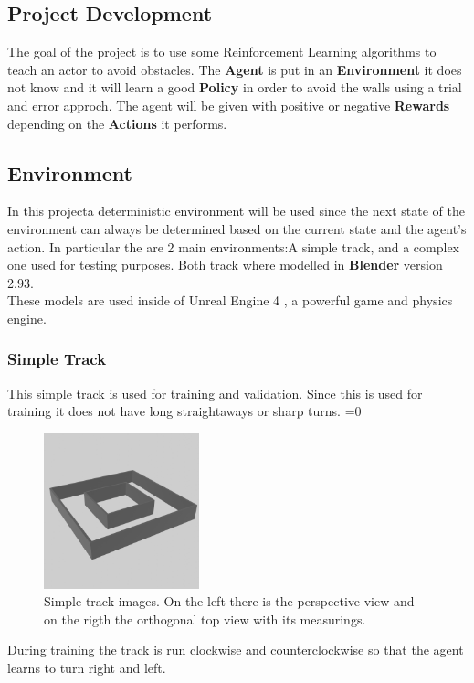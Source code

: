 \documentclass[14pt]{extarticle}
\def\sp{\vspace{5pt}}
\newcounter{debug}
\begin{document}
\newpage
\begin{center}
	\section{Project Development}
	\sp
\end{center}
\begin{flushleft}
	The goal of the project is to use some Reinforcement Learning algorithms to teach an actor to avoid obstacles. The \textbf{Agent} is put in an \textbf{Environment} it does not know and it will learn a good \textbf{Policy} in order to avoid the walls using a trial and error approch. The agent will be given with positive or negative \textbf{Rewards} depending on the \textbf{Actions} it performs. 
	
	\subsection{Environment}
	\sp
	In this projecta deterministic environment will be used since the next state of the environment can always be determined based on the current state and the agent’s action. In particular the are 2 main environments:A simple track, and a complex one used for testing purposes. Both track where modelled in \textbf{Blender} version 2.93\cite{Blender}. \\
	These models are used inside of Unreal Engine 4 \cite{UE4}, a powerful game and physics engine.
	
	\subsubsection{Simple Track}
	This simple track is used for training and validation. Since this is used for training it does not have long straightaways or sharp turns.
	\ifnum\value{debug}=0 {
	\begin{figure}[H]
    		\centering\includegraphics[width=0.4\textwidth]{./Image/Environment/Easy/perspective.png}
		\vspace{5mm}
		\caption{Simple track images. On the left there is the perspective view and on the rigth the orthogonal top view with its measurings.}
	\end{figure}
	}\fi
	During training the track is run clockwise and counterclockwise so that the agent learns to turn right and left.
	

\end{flushleft}
\end{document}
